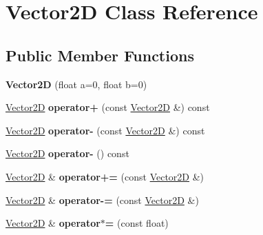 \hypertarget{class_vector2_d}{\section{Vector2\-D Class Reference}
\label{class_vector2_d}
}
\subsection*{Public Member Functions}
\begin{DoxyCompactItemize}
\item 
\hypertarget{class_vector2_d_a25f848a3d2e7918eb8b1b7f3bcbe8b80}{{\bfseries Vector2\-D} (float a=0, float b=0)}\label{class_vector2_d_a25f848a3d2e7918eb8b1b7f3bcbe8b80}

\item 
\hypertarget{class_vector2_d_a8326913d685062bfb06abc8f041d0eb4}{\hyperlink{class_vector2_d}{Vector2\-D} {\bfseries operator+} (const \hyperlink{class_vector2_d}{Vector2\-D} \&) const }\label{class_vector2_d_a8326913d685062bfb06abc8f041d0eb4}

\item 
\hypertarget{class_vector2_d_a8c60be1594b61abfe6a4c155be8f8d5d}{\hyperlink{class_vector2_d}{Vector2\-D} {\bfseries operator-\/} (const \hyperlink{class_vector2_d}{Vector2\-D} \&) const }\label{class_vector2_d_a8c60be1594b61abfe6a4c155be8f8d5d}

\item 
\hypertarget{class_vector2_d_a6a92d36f310fbaefb2b3455f4dcd8820}{\hyperlink{class_vector2_d}{Vector2\-D} {\bfseries operator-\/} () const }\label{class_vector2_d_a6a92d36f310fbaefb2b3455f4dcd8820}

\item 
\hypertarget{class_vector2_d_afa7564ddcd8e27d95f1b9bed7772cdde}{\hyperlink{class_vector2_d}{Vector2\-D} \& {\bfseries operator+=} (const \hyperlink{class_vector2_d}{Vector2\-D} \&)}\label{class_vector2_d_afa7564ddcd8e27d95f1b9bed7772cdde}

\item 
\hypertarget{class_vector2_d_aba680626aa578eeb6e152840ffada6f5}{\hyperlink{class_vector2_d}{Vector2\-D} \& {\bfseries operator-\/=} (const \hyperlink{class_vector2_d}{Vector2\-D} \&)}\label{class_vector2_d_aba680626aa578eeb6e152840ffada6f5}

\item 
\hypertarget{class_vector2_d_a868c5c3253ff3c90a2836a378ef3eb18}{\hyperlink{class_vector2_d}{Vector2\-D} \& {\bfseries operator$\ast$=} (const float)}\label{class_vector2_d_a868c5c3253ff3c90a2836a378ef3eb18}


\end{DoxyCompactItemize}
